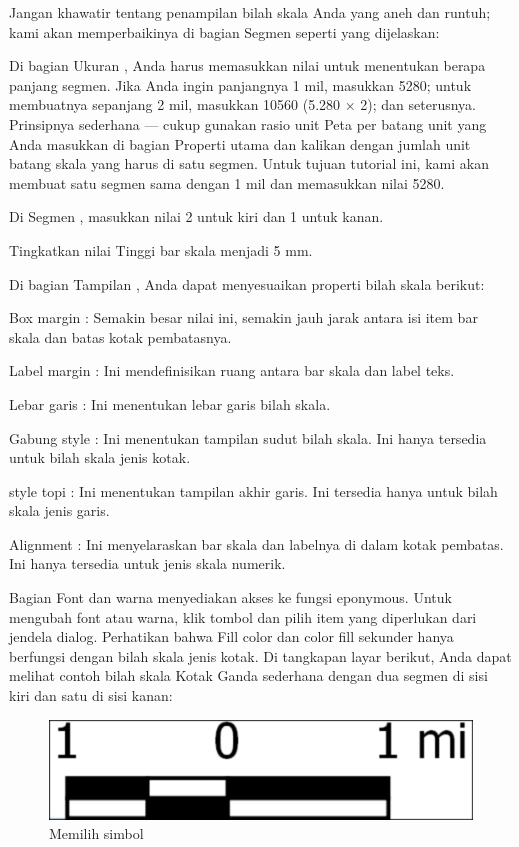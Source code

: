 \documentclass[]{book}
\begin{document}
Jangan khawatir tentang penampilan bilah skala Anda yang aneh dan runtuh; kami akan memperbaikinya di bagian Segmen seperti yang dijelaskan:

Di bagian Ukuran , Anda harus memasukkan nilai untuk menentukan berapa panjang segmen. Jika Anda ingin panjangnya 1 mil, masukkan 5280; untuk membuatnya sepanjang 2 mil, masukkan 10560 (5.280 × 2); dan seterusnya. Prinsipnya sederhana --- cukup gunakan rasio unit Peta per batang unit yang Anda masukkan di bagian Properti utama dan kalikan dengan jumlah unit batang skala yang harus di satu segmen. Untuk tujuan tutorial ini, kami akan membuat satu segmen sama dengan 1 mil dan memasukkan nilai 5280.

Di Segmen , masukkan nilai 2 untuk kiri dan 1 untuk kanan.

Tingkatkan nilai Tinggi bar skala menjadi 5 mm.

Di bagian Tampilan , Anda dapat menyesuaikan properti bilah skala berikut:

Box margin : Semakin besar nilai ini, semakin jauh jarak antara isi item bar skala dan batas kotak pembatasnya.

Label margin : Ini mendefinisikan ruang antara bar skala dan label teks.

Lebar garis : Ini menentukan lebar garis bilah skala.

Gabung style : Ini menentukan tampilan sudut bilah skala. Ini hanya tersedia untuk bilah skala jenis kotak.

style topi : Ini menentukan tampilan akhir garis. Ini tersedia hanya untuk bilah skala jenis garis.

Alignment : Ini menyelaraskan bar skala dan labelnya di dalam kotak pembatas. Ini hanya tersedia untuk jenis skala numerik.

Bagian Font dan warna menyediakan akses ke fungsi eponymous. Untuk mengubah font atau warna, klik tombol dan pilih item yang diperlukan dari jendela dialog. Perhatikan bahwa Fill color dan color fill sekunder hanya berfungsi dengan bilah skala jenis kotak. Di tangkapan layar berikut, Anda dapat melihat contoh bilah skala Kotak Ganda sederhana dengan dua segmen di sisi kiri dan satu di sisi kanan:

\begin{figure}

{\centering \includegraphics[width=0.3\linewidth]{images/09/fig910} 

}

\caption{Memilih simbol}\label{fig:fig910}
\end{figure}
\end{document}
